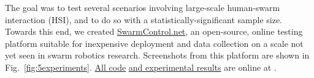 {%

The goal was to test several scenarios involving large-scale human-swarm interaction (HSI), and to do so with a statistically-significant sample size. Towards this end, we created \href{http://www.swarmcontrol.net/show_results}{SwarmControl.net}, an open-source, online testing platform suitable for inexpensive deployment and data collection on a scale not yet seen in swarm robotics research. Screenshots from this platform are shown in Fig.~\ref{fig:5experiments}.  \href{https://github.com/crertel/swarmmanipulate.git}{All code} \href{http://www.swarmcontrol.net/show_results}{and experimental results} are online at \cite{Chris-Ertel2016}.

}
